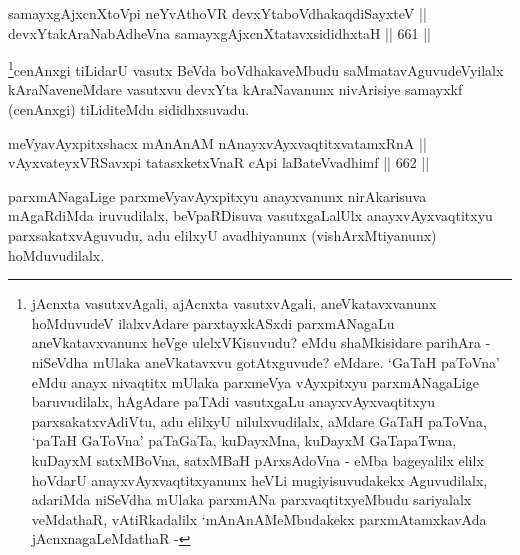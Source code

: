 
\begin{shl}
samayxgAjxcnXtoV\s pi neYvAthoVR devxYtaboVdhakaqdiSayxteV || \\
devxYtakAraNabAdheVna samayxgAjxcnXtatavxsididhxtaH \hfill || 661 ||  
\end{shl}

\begin{artha}
\footnote{jAcnxta vasutxvAgali, ajAcnxta vasutxvAgali,
aneVkatavxvanunx hoMduvudeV ilalxvAdare parxtayxkASxdi parxmANagaLu
aneVkatavxvanunx heVge ulelxVKisuvudu? eMdu shaMkisidare parihAra
- niSeVdha mUlaka aneVkatavxvu gotAtxguvude? eMdare. `GaTaH
paToVna' eMdu anayx nivaqtitx mUlaka parxmeVya vAyxpitxyu
parxmANagaLige baruvudilalx, hAgAdare paTAdi vasutxgaLu
anayxvAyxvaqtitxyu parxsakatxvAdiVtu, adu elilxyU nilulxvudilalx,
aMdare GaTaH paToVna, `paTaH GaToVna' paTaGaTa, kuDayxMna, kuDayxM
GaTapaTwna, kuDayxM satxMBoVna, satxMBaH pArxsAdoVna - eMba
bageyalilx elilx hoVdarU anayxvAyxvaqtitxyanunx heVLi
mugiyisuvudakekx Aguvudilalx, adariMda niSeVdha mUlaka parxmANa
parxvaqtitxyeMbudu sariyalalx veMdathaR, vAtiRkadalilx
`mAnAnAMeMbudakekx parxmAtamxkavAda jAcnxnagaLeMdathaR -}cenAnxgi tiLidarU vasutx BeVda boVdhakaveMbudu saMmatavAguvudeVyilalx kAraNaveneMdare vasutxvu devxYta kAraNavanunx nivArisiye samayxkf (cenAnxgi) tiLiditeMdu sididhxsuvadu.
\end{artha}

\begin{shl}
meVyavAyxpitxshacx mAnAnAM nAnayxvAyxvaqtitxvatamxRnA || \\
vAyxvateyxVRSavxpi tatasxketxVnaR cApi laBateV\s vadhimf  \hfill || 662 ||  
\end{shl}

\begin{artha}
parxmANagaLige parxmeVyavAyxpitxyu anayxvanunx nirAkarisuva mAgaRdiMda iruvudilalx, beVpaRDisuva vasutxgaLalUlx anayxvAyxvaqtitxyu parxsakatxvAguvudu, adu elilxyU avadhiyanunx (vishArxMtiyanunx) hoMduvudilalx.
\end{artha}





